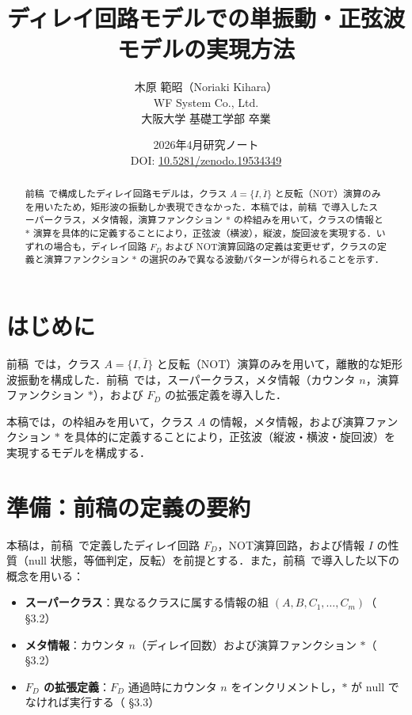 \documentclass[12pt,a4paper]{ltjsarticle}
\title{ディレイ回路モデルでの単振動・正弦波モデルの実現方法}
\author{木原 範昭（Noriaki Kihara）\\
WF System Co., Ltd.\\
大阪大学 基礎工学部 卒業}
\date{2026年4月\quad 研究ノート\\[4pt]
DOI: \href{https://doi.org/10.5281/zenodo.19534349}{10.5281/zenodo.19534349}}
\begin{document}
\maketitle

\begin{abstract}
前稿~\cite{ref1}で構成したディレイ回路モデルは，クラス $A = \{I, \overline{I}\}$ と反転（NOT）演算のみを用いたため，矩形波の振動しか表現できなかった．本稿では，前稿~\cite{ref2}で導入したスーパークラス，メタ情報，演算ファンクション $*$ の枠組みを用いて，クラスの情報と $*$ 演算を具体的に定義することにより，正弦波（横波），縦波，旋回波を実現する．いずれの場合も，ディレイ回路 $F_D$ および NOT演算回路の定義は変更せず，クラスの定義と演算ファンクション $*$ の選択のみで異なる波動パターンが得られることを示す．
\end{abstract}

\section{はじめに}

前稿~\cite{ref1}では，クラス $A = \{I, \overline{I}\}$ と反転（NOT）演算のみを用いて，離散的な矩形波振動を構成した．前稿~\cite{ref2}では，スーパークラス，メタ情報（カウンタ $n$，演算ファンクション $*$），および $F_D$ の拡張定義を導入した．

本稿では，\cite{ref2}の枠組みを用いて，クラス $A$ の情報，メタ情報，および演算ファンクション $*$ を具体的に定義することにより，正弦波（縦波・横波・旋回波）を実現するモデルを構成する．

\section{準備：前稿の定義の要約}

本稿は，前稿~\cite{ref1}で定義したディレイ回路 $F_D$，NOT演算回路，および情報 $I$ の性質（null 状態，等価判定，反転）を前提とする．また，前稿~\cite{ref2}で導入した以下の概念を用いる：

\begin{itemize}
  \item \textbf{スーパークラス}：異なるクラスに属する情報の組 $(A, B, C_1, \ldots, C_m)$（\cite{ref2} \S 3.2）
  \item \textbf{メタ情報}：カウンタ $n$（ディレイ回数）および演算ファンクション $*$（\cite{ref2} \S 3.2）
  \item \textbf{$F_D$ の拡張定義}：$F_D$ 通過時にカウンタ $n$ をインクリメントし，$*$ が $\mathrm{null}$ でなければ実行する（\cite{ref2} \S 3.3）
\end{itemize}
\end{document}
